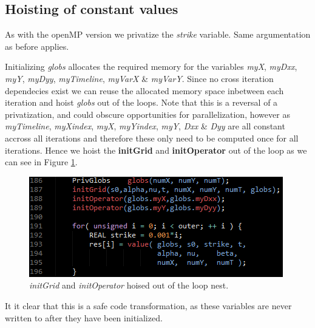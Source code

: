 \subsection{Hoisting of constant values}

As with the openMP version we privatize the \emph{strike} variable. Same
argumentation as before applies.

Initializing \emph{globs} allocates the required memory for the variables
\emph{myX}, \emph{myDxx}, \emph{myY}, \emph{myDyy}, \emph{myTimeline},
\emph{myVarX} \& \emph{myVarY}. Since no cross iteration dependecies exist we
can reuse the allocated memory space inbetween each iteration and hoist
\emph{globs} out of the loops. Note that this is a reversal of a privatization,
and could obscure opportunities for parallelization, however as \emph{myTimeline}, \emph{myXindex},
\emph{myX}, \emph{myYindex}, \emph{myY}, \emph{Dxx} \& \emph{Dyy} are all
constant accross all iterations and therefore these only need to be computed
once for all iterations. Hence we hoist the \textbf{initGrid} and
\textbf{initOperator} out of the loop as we can see in Figure
\ref{fig:globsinit}.

\begin{figure}[!ht]
\centering
\includegraphics[scale=1]{input/figures/globsinit.png}
\caption{\emph{initGrid} and \emph{initOperator} hoised out of the loop nest.\label{fig:globsinit}}
\end{figure}
 
It it clear that this is a safe code transformation, as these variables are
never written to after they have been initialized.

